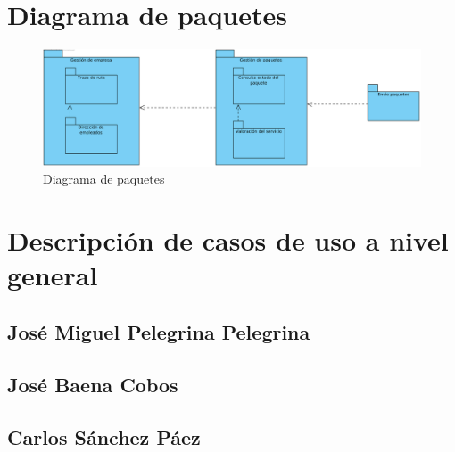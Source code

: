 \documentclass[12pt,spanish]{article}
\begin{document}
\section{Diagrama de paquetes}

\begin{figure}[H]
\centering
\includegraphics[scale=0.5]{paquetes.png}
\caption{Diagrama de paquetes}
\end{figure}

\section{Descripción de casos de uso a nivel general}

\subsection{José Miguel Pelegrina Pelegrina}

\subsection{José Baena Cobos}

\subsection{Carlos Sánchez Páez}


\end{document}
